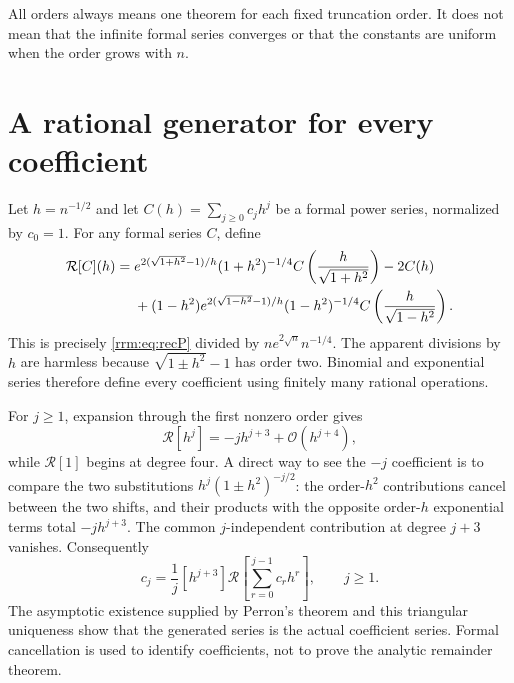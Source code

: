 \documentclass[11pt]{article}
\theoremstyle{remark}\newtheorem{remark}[theorem]{Remark}
\newcommand{\OO}{\mathcal O}
\newcommand{\coef}[2]{[#1^{#2}]}
\begin{document}
All orders always means one theorem for each fixed truncation order. It does not mean that the infinite formal series converges or that the constants are uniform when the order grows with $n$.

\section{A rational generator for every coefficient}\label{rrm:sec:coefficients}
Let $h=n^{-1/2}$ and let $C(h)=\sum_{j\ge0}c_jh^j$ be a formal power series, normalized by $c_0=1$. For any formal series $C$, define
\begin{align}
 \mathcal R[C](h)={}&
 e^{2(\sqrt{1+h^2}-1)/h}(1+h^2)^{-1/4}
 C\left(\frac{h}{\sqrt{1+h^2}}\right)-2C(h)\notag\\
 &+(1-h^2)e^{2(\sqrt{1-h^2}-1)/h}(1-h^2)^{-1/4}
 C\left(\frac{h}{\sqrt{1-h^2}}\right).
 \label{rrm:eq:operator}
\end{align}
This is precisely \eqref{rrm:eq:recP} divided by $ne^{2\sqrt n}n^{-1/4}$. The apparent divisions by $h$ are harmless because $\sqrt{1\pm h^2}-1$ has order two. Binomial and exponential series therefore define every coefficient using finitely many rational operations.

For $j\ge1$, expansion through the first nonzero order gives
\begin{equation}\label{rrm:eq:triangular}
 \mathcal R[h^j]=-jh^{j+3}+\OO(h^{j+4}),
\end{equation}
while $\mathcal R[1]$ begins at degree four. A direct way to see the $-j$ coefficient is to compare the two substitutions $h^j(1\pm h^2)^{-j/2}$: the order-$h^2$ contributions cancel between the two shifts, and their products with the opposite order-$h$ exponential terms total $-jh^{j+3}$. The common $j$-independent contribution at degree $j+3$ vanishes. Consequently
\begin{equation}\label{rrm:eq:cgen}
 c_j=\frac1j\coef{h}{j+3}
 \mathcal R\left[\sum_{r=0}^{j-1}c_rh^r\right],\qquad j\ge1.
\end{equation}
The asymptotic existence supplied by Perron's theorem and this triangular uniqueness show that the generated series is the actual coefficient series. Formal cancellation is used to identify coefficients, not to prove the analytic remainder theorem.
\end{document}
